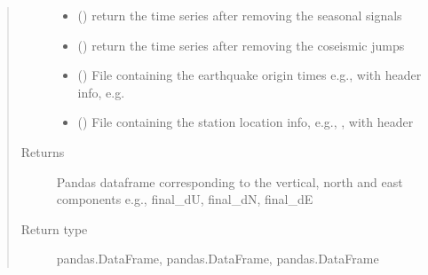 \documentclass[letterpaper,10pt,english]{sphinxmanual}
\begin{document}
\begin{fulllineitems}
\begin{quote}
\begin{description}
\begin{itemize}
\item {} 
\sphinxAtStartPar
{} () \textendash{} return the time series after removing the seasonal signals

\item {} 
\sphinxAtStartPar
{} () \textendash{} return the time series after removing the co\sphinxhyphen{}seismic jumps

\item {} 
\sphinxAtStartPar
{} () \textendash{} File containing the earthquake origin times e.g.,  with header info, e.g. 

\item {} 
\sphinxAtStartPar
{} () \textendash{} File containing the station location info, e.g., , with header 

\end{itemize}

\item[{Returns}] \leavevmode
\sphinxAtStartPar
Pandas dataframe corresponding to the vertical, north and east components e.g., final\_dU, final\_dN, final\_dE

\item[{Return type}] \leavevmode
\sphinxAtStartPar
pandas.DataFrame, pandas.DataFrame, pandas.DataFrame

\end{description}\end{quote}

\begin{sphinxVerbatim}[commandchars=\\\{\}]
   
           
\end{sphinxVerbatim}

\end{fulllineitems}
\end{document}

